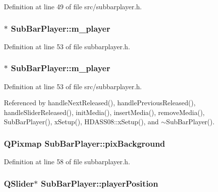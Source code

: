 Definition at line 49 of file src/subbarplayer.h.
\subsubsection{$\ast$ {\bf Sub\-Bar\-Player::m\_\-player}}\label{classSubBarPlayer_SubBarPlayero14}




Definition at line 53 of file subbarplayer.h.
\subsubsection{$\ast$ {\bf Sub\-Bar\-Player::m\_\-player}}\label{classSubBarPlayer_SubBarPlayero4}




Definition at line 53 of file src/subbarplayer.h.

Referenced by handle\-Next\-Released(), handle\-Previous\-Released(), handle\-Slider\-Released(), init\-Media(), insert\-Media(), remove\-Media(), Sub\-Bar\-Player(), x\-Setup(), HDASS08::x\-Setup(), and $\sim$Sub\-Bar\-Player().
\subsubsection{\setlength{\rightskip}{0pt plus 5cm}QPixmap {\bf Sub\-Bar\-Player::pix\-Background}\hspace{0.3cm}{\tt  [private]}}\label{classSubBarPlayer_SubBarPlayerr0}




Definition at line 58 of file subbarplayer.h.
\subsubsection{\setlength{\rightskip}{0pt plus 5cm}QSlider$\ast$ {\bf Sub\-Bar\-Player::player\-Position}}\label{classSubBarPlayer_SubBarPlayero11}




